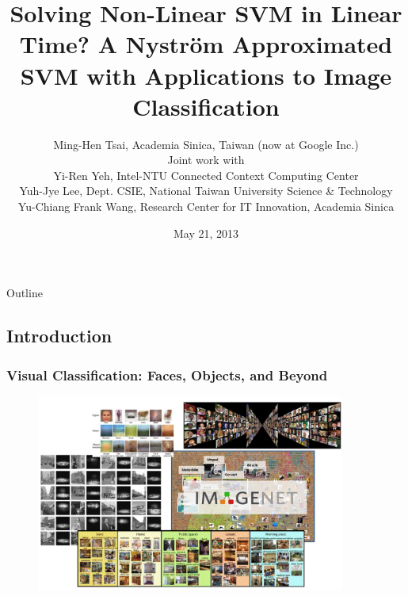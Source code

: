 \documentclass{beamer}
\begin{document}
\section{ }
\title[Nystr\"om Decomposition]{Solving Non-Linear SVM in Linear Time? A Nystr\"om Approximated SVM with Applications to Image Classification}
\author[Ming-Hen Tsai]{
{\scriptsize
Ming-Hen Tsai, Academia Sinica, Taiwan (now at Google Inc.)\\
Joint work with \\
Yi-Ren Yeh, Intel-NTU Connected Context Computing Center \\
Yuh-Jye Lee, Dept. CSIE, National Taiwan University Science \& Technology\\
Yu-Chiang Frank Wang, Research Center for IT Innovation, Academia Sinica\\
}
}
\date{May 21, 2013}




\begin{frame}
\titlepage
\end{frame}

\begin{frame}{Outline}
\tableofcontents[pausesections]
\end{frame}

\subsection{Introduction}

\begin{frame}
  \frametitle{Visual Classification: Faces, Objects, and Beyond}
  \begin{figure}
  \includegraphics[width=4in]{tasks_illus.png}\\
  \end{figure}
\end{frame}
\end{document}

